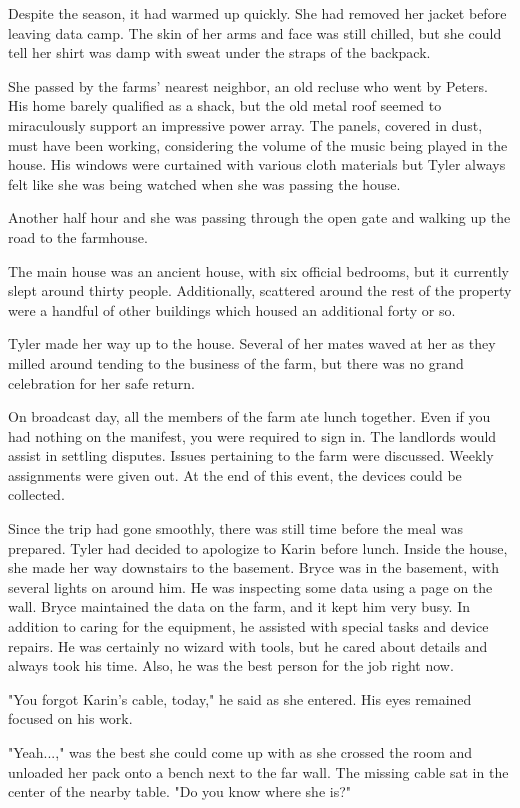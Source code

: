 \documentclass[12pt,novel,nonsubmission,smart]{sffms}
\begin{document}
Despite the season, it had warmed up quickly. She had removed
her jacket before leaving data camp. The skin of her arms and
face was still chilled, but she could tell her shirt was damp
with sweat under the straps of the backpack.

She passed by the farms' nearest neighbor, an old recluse who
went by Peters. His home barely qualified as a shack, but the
old metal roof seemed to miraculously support an impressive
power array. The panels, covered in dust, must have been
working, considering the volume of the music being played in the
house. His windows were curtained with various cloth materials
but Tyler always felt like she was being watched when she was
passing the house.

Another half hour and she was passing through the open gate and
walking up the road to the farmhouse.

The main house was an ancient house, with six official bedrooms,
but it currently slept around thirty people. Additionally,
scattered around the rest of the property were a handful of
other buildings which housed an additional forty or so.

Tyler made her way up to the house. Several of her mates waved
at her as they milled around tending to the business of the
farm, but there was no grand celebration for her safe return.

On broadcast day, all the members of the farm ate lunch
together. Even if you had nothing on the manifest, you were
required to sign in. The landlords would assist in settling
disputes. Issues pertaining to the farm were discussed. Weekly
assignments were given out. At the end of this event, the
devices could be collected.

Since the trip had gone smoothly, there was still time before
the meal was prepared. Tyler had decided to apologize to Karin
before lunch. Inside the house, she made her way downstairs to
the basement. Bryce was in the basement, with several lights on
around him. He was inspecting some data using a page on the
wall. Bryce maintained the data on the farm, and it kept him
very busy. In addition to caring for the equipment, he assisted
with special tasks and device repairs. He was certainly no
wizard with tools, but he cared about details and always took
his time. Also, he was the best person for the job right now.

"You forgot Karin's cable, today," he said as she entered. His
eyes remained focused on his work.

"Yeah...," was the best she could come up with as she crossed
the room and unloaded her pack onto a bench next to the far
wall. The missing cable sat in the center of the nearby table.
"Do you know where she is?"
\end{document}
